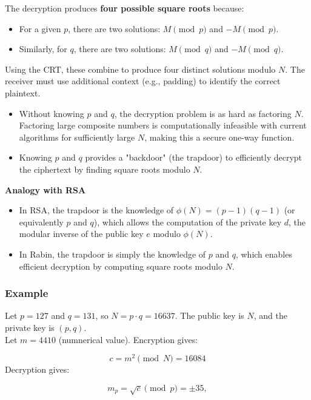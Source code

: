 The decryption produces \textbf{four possible square roots} because:
\begin{itemize}
    \item For a given \( p \), there are two solutions: \( M \pmod{p} \) and \( -M \pmod{p} \).
    \item Similarly, for \( q \), there are two solutions: \( M \pmod{q} \) and \( -M \pmod{q} \).
\end{itemize}
Using the CRT, these combine to produce four distinct solutions modulo \( N \). The receiver must use additional context (e.g., padding) to identify the correct plaintext.

\begin{itemize}
    \item Without knowing \( p \) and \( q \), the decryption problem is as hard as factoring \( N \). Factoring large composite numbers is computationally infeasible with current algorithms for sufficiently large \( N \), making this a secure one-way function.
    \item Knowing \( p \) and \( q \) provides a "backdoor" (the trapdoor) to efficiently decrypt the ciphertext by finding square roots modulo \( N \).
\end{itemize}

\textbf{Analogy with RSA}
\begin{itemize}
    \item In RSA, the trapdoor is the knowledge of \( \phi(N) = (p-1)(q-1) \) (or equivalently \( p \) and \( q \)), which allows the computation of the private key \( d \), the modular inverse of the public key \( e \) modulo \( \phi(N) \).
    \item In Rabin, the trapdoor is simply the knowledge of \( p \) and \( q \), which enables efficient decryption by computing square roots modulo \( N \).
\end{itemize}

\subsubsection{Example}
Let \( p = 127 \) and \( q = 131 \), so \( N = p \cdot q = 16637 \). 
The public key is \( N \), and the private key is \( (p, q) \). \\

Let \(m=4410\) (numnerical value). Encryption gives:

\[ c = m^2 \pmod{N} = 16084 \]
Decryption gives:

\[ m_p = \sqrt{c} \pmod{p} = \pm 35, \]

